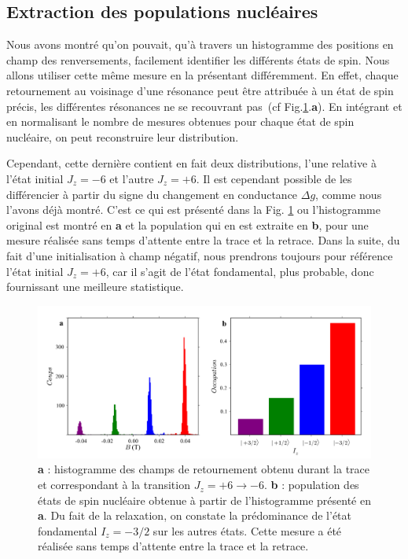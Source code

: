 \subsection{Extraction des populations nucléaires}
Nous avons montré qu'on pouvait, qu'à travers un histogramme des positions en champ des renversements, facilement identifier les différents états de spin. Nous allons utiliser cette m\^eme mesure en la présentant différemment. En effet, chaque retournement au voisinage d'une résonance peut \^etre attribuée à un état de spin précis, les différentes résonances ne se recouvrant pas~(cf Fig.\ref{extract_pop}.\textbf{a}). En intégrant et en normalisant le nombre de mesures obtenues pour chaque état de spin nucléaire, on peut reconstruire leur distribution. 

Cependant, cette dernière contient en fait deux distributions, l'une relative à l'état initial $J_z=-6$ et l'autre $J_z=+6$. Il est cependant possible de les différencier à partir du signe du changement en conductance $\Delta g$, comme nous l'avons déjà montré. C'est ce qui est présenté dans la Fig. \ref{extract_pop} ou l'histogramme original est montré en \textbf{a} et la population qui en est extraite en \textbf{b}, pour une mesure réalisée sans temps d'attente entre la trace et la retrace. Dans la suite, du fait d'une initialisation à champ négatif, nous prendrons toujours pour référence l'état initial $J_z=+6$, car il s'agit de l'état fondamental, plus probable, donc fournissant une meilleure statistique.

\begin{figure}
\includegraphics[scale=0.45]{Resultats/PopState/PopState.pdf} 
\caption{\textbf{a} : histogramme des champs de retournement obtenu durant la trace et correspondant à la transition $J_z = +6 \rightarrow -6$. \textbf{b} : population des états de spin nucléaire obtenue à partir de l'histogramme présenté en \textbf{a}. Du fait de la relaxation, on constate la prédominance de l'état fondamental $I_z=-3/2$ sur les autres états. Cette mesure a été réalisée sans temps d'attente entre la trace et la retrace.}
\label{extract_pop}
\end{figure}

